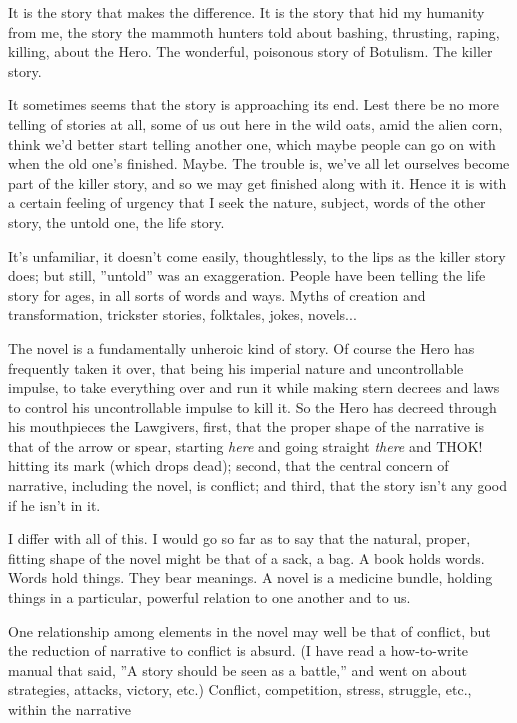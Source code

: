 It is the story that makes the difference. It is
the story that hid my humanity from me, the
story the mammoth hunters told about bashing,
thrusting, raping, killing, about the Hero. The
wonderful, poisonous story of Botulism. The
killer story.

It sometimes seems that the story is
approaching its end. Lest there be no more
telling of stories at all, some of us out here in the
wild oats, amid the alien corn, think we’d better
start telling another one, which maybe people
can go on with when the old one’s finished.
Maybe. The trouble is, we’ve all let ourselves
become part of the killer story, and so we may
get finished along with it. Hence it is with a
certain feeling of urgency that I seek the nature,
subject, words of the other story, the untold one,
the life story.

It’s unfamiliar, it doesn’t come easily,
thoughtlessly, to the lips as the killer story does;
but still, ''untold'' was an exaggeration. People 
have been telling the life story for ages, in all
sorts of words and ways. Myths of creation and
transformation, trickster stories, folktales, jokes,
novels...

The novel is a fundamentally unheroic kind of
story. Of course the Hero has frequently taken it
over, that being his imperial nature and
uncontrollable impulse, to take everything over
and run it while making stern decrees and laws
to control his uncontrollable impulse to kill it. So
the Hero has decreed through his mouthpieces
the Lawgivers, first, that the proper shape of the
narrative is that of the arrow or spear,
starting \textit{here} and going straight \textit{there} and THOK!
hitting its mark (which drops dead); second, that
the central concern of narrative, including the
novel, is conflict; and third, that the story isn’t
any good if he isn’t in it.

I differ with all of this. I would go so far as to
say that the natural, proper, fitting shape of the
novel might be that of a sack, a bag. A book holds
words. Words hold things. They bear meanings.
A novel is a medicine bundle, holding things in a
particular, powerful relation to one another and
to us.

One relationship among elements in the novel
may well be that of conflict, but the reduction of
narrative to conflict is absurd. (I have read a
how-to-write manual that said, ''A story should
be seen as a battle,'' and went on about strategies,
attacks, victory, etc.) Conflict, competition,
stress, struggle, etc., within the narrative

